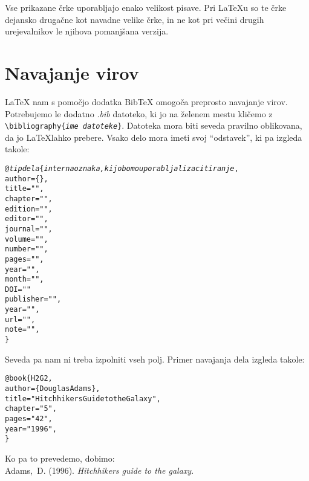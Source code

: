 \documentclass[a4paper]{book}
\newcommand\tbs{\textbackslash{}}
\begin{document}
Vse prikazane črke uporabljajo enako velikost pisave. Pri \LaTeX{}u so te črke dejansko drugačne kot navadne velike črke, in ne kot pri večini drugih urejevalnikov le njihova pomanjšana verzija.


\section{Navajanje virov}

\LaTeX{} nam s pomočjo dodatka Bib\TeX{} omogoča preprosto navajanje virov. Potrebujemo le dodatno \textit{.bib} datoteko, ki jo na želenem mestu kličemo z \texttt{\tbs{}bibliography\{\textit{ime datoteke}\}}. Datoteka mora biti seveda pravilno oblikovana, da jo \LaTeX lahko prebere.
Vsako delo mora imeti svoj ``odstavek'', ki pa izgleda takole:

\begin{alltt}

@\textit{tip dela}\{\textit{interna oznaka, ki jo bomo uporabljali za citiranje},
  author = \{\},
  title = "",
  chapter = "",
  edition = "",
  editor = "",
  journal = "",
  volume = "",
  number = "",
  pages = "",
  year = "",
  month = "",
  DOI = ""
  publisher = "",
  year = "",
  url = "",
  note = "",
\}

\end{alltt}

Seveda pa nam ni treba izpolniti vseh polj. Primer navajanja dela izgleda takole:

\begin{alltt}

@book \{H2G2,
  author = \{Douglas Adams\},
  title = "Hitchhikers Guide to the Galaxy",
  chapter = "5",
  pages = "42",
  year = "1996",
\}

\end{alltt}

Ko pa to prevedemo, dobimo:\\

\noindent{}Adams,~D. (1996). \textit{Hitchhikers guide to the galaxy}.


\end{document}
